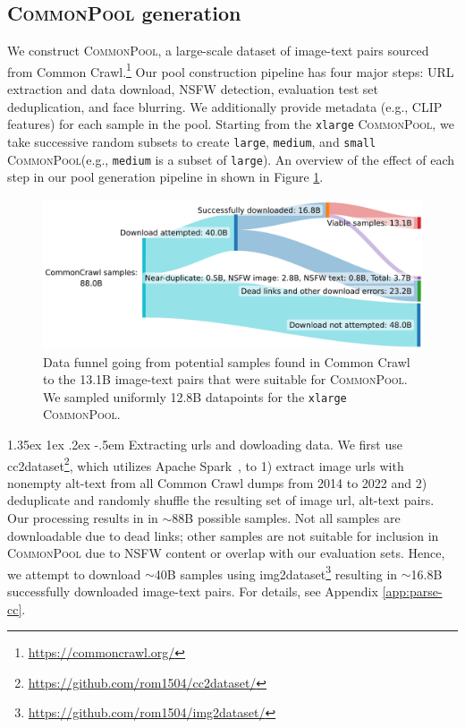 \documentclass[dvipsnames,11pt]{article}
\makeatletter
\renewcommand\paragraph{\@startsection{paragraph}{4}{\z@}                                     {1.35ex \@plus1ex \@minus.2ex}                                {-.5em}
{\normalfont\normalsize\bfseries}}
\newcommand{\pool}{\textsc{CommonPool}\xspace}
\makeatother
\begin{document}
\subsection{\pool generation}
\label{sec:pool}
We construct \pool, a large-scale dataset of image-text pairs sourced from Common Crawl.\footnote{\url{https://commoncrawl.org/}}
Our pool construction pipeline has four major steps: URL extraction and data download, NSFW detection, evaluation test set deduplication, and face blurring. We additionally provide metadata (e.g., CLIP features) for each sample in the pool.
Starting from the {\small \texttt{xlarge}} \pool, we take successive random subsets to create {\small \texttt{large}}, {\small \texttt{medium}}, and {\small \texttt{small}} \pool (e.g., {\small \texttt{medium}} is a subset of {\small \texttt{large}}).
An overview of the effect of each step in our pool generation pipeline in shown in Figure \ref{fig:data_pipeline}.

\begin{figure}
    \centering
    \includegraphics[width=0.95\linewidth]{figures/appx-datapipeline.pdf}
    \caption{Data funnel going from potential samples found in Common Crawl to the  13.1B image-text pairs that were suitable for \pool. We sampled uniformly 12.8B datapoints for the \small{\texttt{xlarge}} \pool.}
    \label{fig:data_pipeline}
\end{figure}


\paragraph{Extracting urls and dowloading data.} We first use cc2dataset\footnote{\url{https://github.com/rom1504/cc2dataset/}}, which utilizes Apache Spark~\cite{zaharia2016apache}, to 1) extract image urls with nonempty alt-text from all Common Crawl dumps from 2014 to 2022 and 2) deduplicate and randomly shuffle the resulting set of image url, alt-text pairs. Our processing results in in $\sim$88B possible samples. Not all samples are downloadable due to dead links; other samples are not suitable for inclusion in \pool due to NSFW content or overlap with our evaluation sets.
Hence, we attempt to download $\sim$40B samples using img2dataset\footnote{\url{https://github.com/rom1504/img2dataset/}} resulting in $\sim$16.8B successfully downloaded image-text pairs. 
For details, see Appendix \ref{app:parse-cc}.
\end{document}
